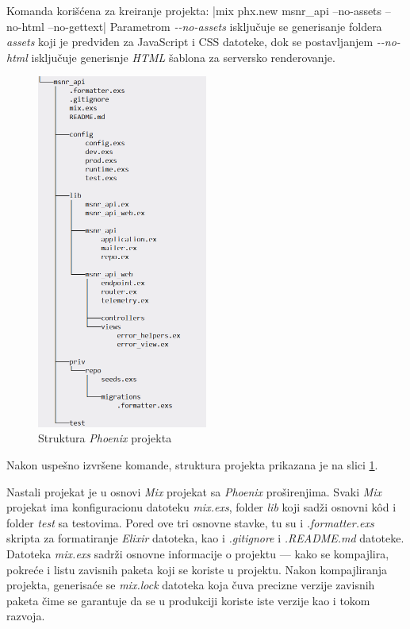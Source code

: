 \documentclass[12pt,oneside]{memoir}
\begin{document}
Komanda korišćena za kreiranje projekta:
|mix phx.new msnr_api --no-assets --no-html --no-gettext|
\noindent Parametrom \emph{-{}-no-assets} isključuje se generisanje foldera \emph{assets} koji je predviđen za JavaScript i CSS datoteke,
dok se postavljanjem \emph{-{}-no-html} isključuje generisnje \emph{HTML} šablona za serversko renderovanje.
\begin{figure}[!h]
  \centering
  \includegraphics[width=0.5\textwidth]{msnr-dir.png}
  \caption{Struktura \emph{Phoenix} projekta}
  \label{fig:msnr-dir}
\end{figure}
Nakon uspešno izvršene komande, struktura projekta prikazana je na slici \ref{fig:msnr-dir}.

Nastali projekat je u osnovi \emph{Mix} projekat sa \emph{Phoenix} proširenjima. Svaki \emph{Mix} projekat ima
konfiguracionu datoteku \emph{mix.exs}, folder \emph{lib} koji sadži osnovni k\^{o}d i folder \emph{test} sa testovima.
Pored ove tri osnovne stavke, tu su i \emph{.formatter.exs} skripta za formatiranje \emph{Elixir} datoteka, kao i \emph{.gitignore} i
\emph{.README.md} datoteke. Datoteka \emph{mix.exs} sadrži osnovne informacije o projektu --- kako se kompajlira, pokreće i 
listu zavisnih paketa koji se koriste u projektu. Nakon kompajliranja projekta, generisaće se \emph{mix.lock} datoteka koja
čuva precizne verzije zavisnih paketa čime se garantuje da se u produkciji koriste iste verzije kao i tokom razvoja.
\end{document}
